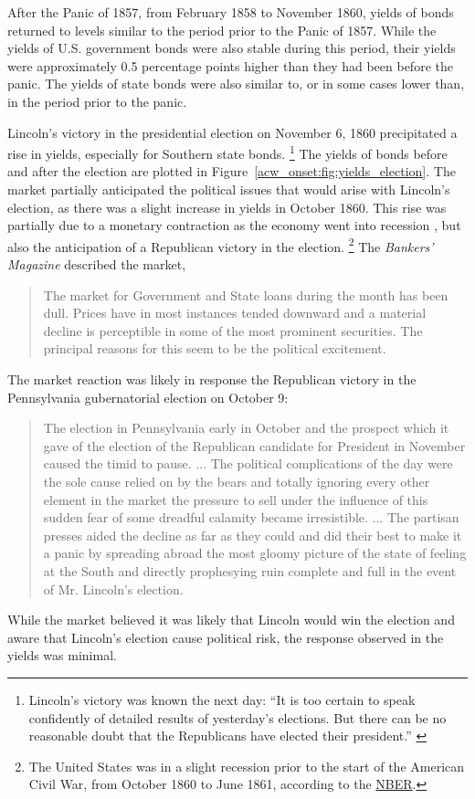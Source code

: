 After the Panic of 1857, from February 1858 to November 1860, yields of bonds returned to levels similar to the period prior to the Panic of 1857.
While the yields of U.S. government bonds were also stable during this period, their yields were approximately 0.5 percentage points higher than they had been before the panic.
The yields of state bonds were also similar to, or in some cases lower than, in the period prior to the panic.

Lincoln's victory in the presidential election on November 6, 1860 precipitated a rise in yields, especially for Southern state bonds.%
\footnote{Lincoln's victory was known the next day: ``It is too certain to speak confidently of detailed results of yesterday's elections. But there can be no reasonable doubt that the Republicans have elected their president.'' \parencite{NYT1860}}
The yields of bonds before and after the election are plotted in Figure~\ref{acw_onset:fig:yields_election}.
The market partially anticipated the political issues that would arise with Lincoln's election, as there was a slight increase in yields in October 1860.
This rise was partially due to a monetary contraction as the economy went into recession \parencite[413]{BankersMagazine1860}, but also the anticipation of a Republican victory in the election.%
\footnote{The United States was in a slight recession prior to the start of the American Civil War, from October 1860 to June 1861, according to the  \href{http://www.nber.org/cycles/cyclesmain.html}{NBER}.}
The \textit{Bankers' Magazine} described the market,
\begin{quote}
   The market for Government and State loans during the month has been dull.
   Prices have in most instances tended downward and a material decline is perceptible in some of the most prominent securities.
   The principal reasons for this seem to be the political excitement.  \parencite[414]{BankersMagazine1860}
\end{quote}
The market reaction was likely in response the Republican victory in the Pennsylvania gubernatorial election on October 9:
\begin{quote}
  The election in Pennsylvania early in October and the prospect which it gave of the election of the Republican candidate for President in November caused the timid to pause. ...
  The political complications of the day were the sole cause relied on by the bears and totally ignoring every other element in the market the pressure to sell under the influence of this sudden fear of some dreadful calamity became irresistible. ...
  The partisan presses aided the decline as far as they could and did their best to make it a panic by spreading abroad the most gloomy picture of the state of feeling at the South and directly prophesying ruin complete and full in the event of Mr. Lincoln's election.
  \parencites[476-77]{BankersMagazine1860}
\end{quote}
While the market believed it was likely that Lincoln would win the election and aware that Lincoln's election cause political risk, the  response observed in the yields was minimal.

